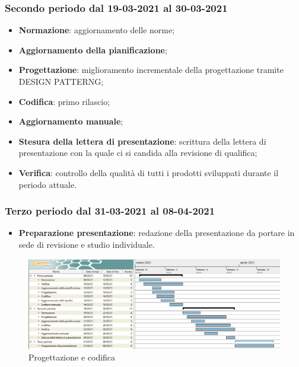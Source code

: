 	\subsubsection{Secondo periodo dal 19-03-2021 al 30-03-2021}
	\begin{itemize}
	\item \textbf{Normazione}: aggiornamento delle norme;
	\item \textbf{Aggiornamento della pianificazione};
	\item \textbf{Progettazione}: miglioramento incrementale della progettazione tramite DESIGN PATTERNG;
	\item \textbf{Codifica}: primo rilascio;
	\item \textbf{Aggiornamento manuale};
	\item \textbf{Stesura della lettera di presentazione}: scrittura della lettera di presentazione con la quale ci
	si candida alla revisione di qualifica;
	\item \textbf{Verifica}: controllo della qualità di tutti i prodotti sviluppati durante il periodo attuale.
	\end{itemize}

	\subsubsection{Terzo periodo dal 31-03-2021 al 08-04-2021}
	\begin{itemize}
	\item \textbf{Preparazione presentazione}: redazione della presentazione da portare in sede di revisione e
	studio individuale.
	\end{itemize}

	\newpage
	
	\begin{landscape}
	\begin{figure}[h!]
		\includegraphics[width=24cm]{images/4_Progettazione_e_codifica.png}
		\caption{Progettazione e codifica}
	\end{figure}
	\end{landscape}

